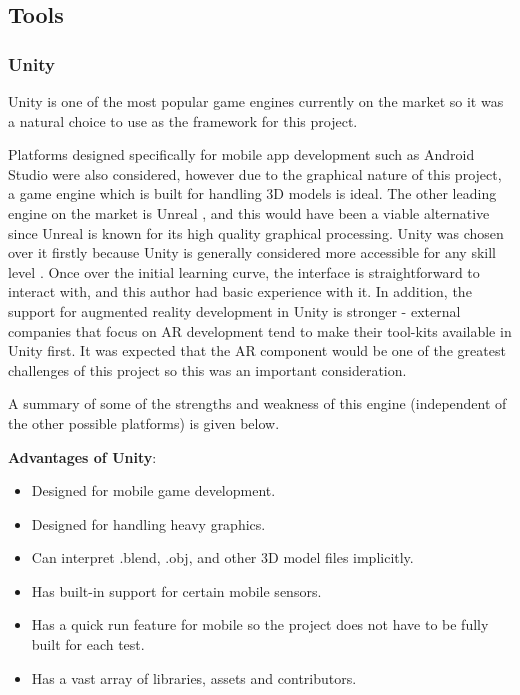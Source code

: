 \documentclass[12pt, a4paper]{article}
\begin{document}
\subsection{Tools}
\subsubsection{Unity}
Unity is one of the most popular game engines currently on the market \cite{design:unity} so it was a natural choice to use as the framework for this project. 

Platforms designed specifically for mobile app development such as Android Studio \cite{design:android} were also considered, however due to the graphical nature of this project, a game engine which is built for handling 3D models is ideal. The other leading engine on the market is Unreal \cite{design:unreal}, and this would have been a viable alternative since Unreal is known for its high quality graphical processing. Unity was chosen over it firstly because Unity is generally considered more accessible for any skill level \cite{design:unrealvsunity}. Once over the initial learning curve, the interface is straightforward to interact with, and this author had basic experience with it. In addition, the support for augmented reality development in Unity is stronger - external companies that focus on AR development tend to make their tool-kits available in Unity first. It was expected that the AR component would be one of the greatest challenges of this project so this was an important consideration.

A summary of some of the strengths and weakness of this engine (independent of the other possible platforms) is given below.

\newpage
\textbf{Advantages of Unity}:
\begin{itemize}
    \item Designed for mobile game development.
    \item Designed for handling heavy graphics.
    \item Can interpret .blend, .obj, and other 3D model files implicitly.
    \item Has built-in support for certain mobile sensors.
    \item Has a quick run feature for mobile so the project does not have to be fully built for each test. 
    \item Has a vast array of libraries, assets and contributors.
\end{itemize}
\end{document}
